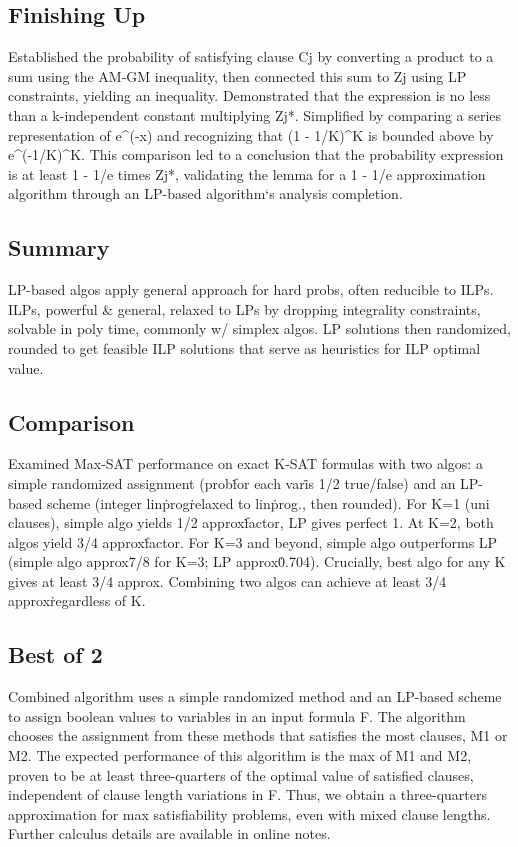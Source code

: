 \subsection*{Finishing Up}
Established the probability of satisfying clause Cj by converting a product to a sum using the AM-GM inequality, then connected this sum to Zj using LP constraints, yielding an inequality.
Demonstrated that the expression is no less than a k-independent constant multiplying Zj*.
Simplified by comparing a series representation of e\textasciicircum{}(-x) and recognizing that (1 - 1/K)\textasciicircum{}K is bounded above by e\textasciicircum{}(-1/K)\textasciicircum{}K\@.
This comparison led to a conclusion that the probability expression is at least 1 - 1/e times Zj*, validating the lemma for a 1 - 1/e approximation algorithm through an LP-based algorithm`s analysis completion.

\subsection*{Summary}
LP-based algos apply general approach for hard probs, often reducible to ILPs.
ILPs, powerful \& general, relaxed to LPs by dropping integrality constraints, solvable in poly time, commonly w/ simplex algos.
LP solutions then randomized, rounded to get feasible ILP solutions that serve as heuristics for ILP optimal value.

\subsection*{Comparison}
Examined Max-SAT performance on exact K-SAT formulas with two algos: a simple randomized assignment (prob\. for each var\. is 1/2 true/false) and an LP-based scheme (integer lin\. prog\. relaxed to lin\. prog., then rounded).
For K=1 (uni clauses), simple algo yields 1/2 approx\. factor, LP gives perfect 1.
At K=2, both algos yield 3/4 approx\. factor.
For K=3 and beyond, simple algo outperforms LP (simple algo approx\. 7/8 for K=3; LP approx\. 0.704).
Crucially, best algo for any K gives at least 3/4 approx.
Combining two algos can achieve at least 3/4 approx\. regardless of K\@.

\subsection*{Best of 2}
Combined algorithm uses a simple randomized method and an LP-based scheme to assign boolean values to variables in an input formula F\@.
The algorithm chooses the assignment from these methods that satisfies the most clauses, M1 or M2.
The expected performance of this algorithm is the max of M1 and M2, proven to be at least three-quarters of the optimal value of satisfied clauses, independent of clause length variations in F\@.
Thus, we obtain a three-quarters approximation for max satisfiability problems, even with mixed clause lengths.
Further calculus details are available in online notes.

